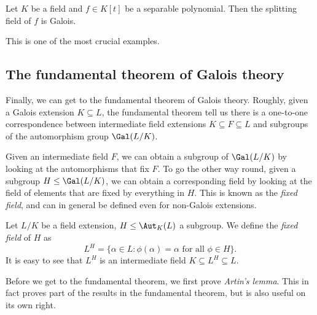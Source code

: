 \documentclass[a4paper]{article}
\begin{document}
\begin{cor}
  Let $K$ be a field and $f \in K[t]$ be a separable polynomial. Then the splitting field of $f$ is Galois.
\end{cor}
This is one of the most crucial examples.

\subsection{The fundamental theorem of Galois theory}
Finally, we can get to the fundamental theorem of Galois theory. Roughly, given a Galois extension $K \subseteq L$, the fundamental theorem tell us there is a one-to-one correspondence between intermediate field extensions $K \subseteq F \subseteq L$ and subgroups of the automorphism group $\Gal(L/K)$.

Given an intermediate field $F$, we can obtain a subgroup of $\Gal(L/K)$ by looking at the automorphisms that fix $F$. To go the other way round, given a subgroup $H \leq \Gal(L/K)$, we can obtain a corresponding field by looking at the field of elements that are fixed by everything in $H$. This is known as the \emph{fixed field}, and can in general be defined even for non-Galois extensions.

\begin{defi}
  Let $L/K$ be a field extension, $H\leq \Aut_K(L)$ a subgroup. We define the \emph{fixed field} of $H$ as
  \[
    L^H = \{\alpha \in L: \phi(\alpha) = \alpha\text{ for all }\phi \in H\}.
  \]
  It is easy to see that $L^H$ is an intermediate field $K\subseteq L^H \subseteq L$.
\end{defi}

Before we get to the fundamental theorem, we first prove \emph{Artin's lemma}. This in fact proves part of the results in the fundamental theorem, but is also useful on its own right.
\end{document}
